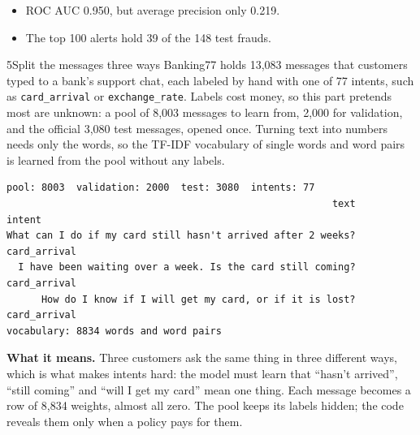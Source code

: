 \begin{labcheckpoint}
\begin{itemize}[leftmargin=1.2em,itemsep=2pt,topsep=1pt]
  \item ROC AUC 0.950, but average precision only 0.219.
  \item The top 100 alerts hold 39 of the 148 test frauds.
\end{itemize}
\end{labcheckpoint}


\begin{labquestion}{5}{Split the messages three ways}
Banking77 holds 13,083 messages that customers typed to a bank's support chat, each labeled by hand with one of 77 intents, such as \texttt{card\_arrival} or \texttt{exchange\_rate}. Labels cost money, so this part pretends most are unknown: a pool of 8,003 messages to learn from, 2,000 for validation, and the official 3,080 test messages, opened once. Turning text into numbers needs only the words, so the TF-IDF vocabulary of single words and word pairs is learned from the pool without any labels.
\end{labquestion}
\begin{labanswer}

\begin{refoutput}
\begin{lstlisting}[style=utpterminal]
pool: 8003  validation: 2000  test: 3080  intents: 77
                                                        text       intent
What can I do if my card still hasn't arrived after 2 weeks? card_arrival
  I have been waiting over a week. Is the card still coming? card_arrival
      How do I know if I will get my card, or if it is lost? card_arrival
vocabulary: 8834 words and word pairs
\end{lstlisting}
\end{refoutput}

\textbf{What it means.} Three customers ask the same thing in three different ways, which is what makes intents hard: the model must learn that ``hasn't arrived'', ``still coming'' and ``will I get my card'' mean one thing. Each message becomes a row of 8,834 weights, almost all zero. The pool keeps its labels hidden; the code reveals them only when a policy pays for them.
\end{labanswer}

